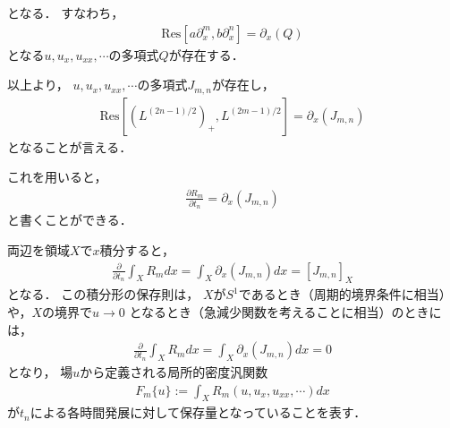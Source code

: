 \documentclass[dvipdfmx,12pt,a4paper,uplatex]{jsarticle}
\theoremstyle{plain}
\theoremstyle{definition}
\begin{document}
となる．
すなわち，
\begin{align}
\mathrm{Res}
\left[a\partial_x^m , b\partial_x^n \right] 
=
\partial_x(Q)
\end{align}
となる$u,u_x,u_{xx},\cdots$の多項式$Q$が存在する．

以上より，
$u,u_x,u_{xx},\cdots$の多項式$J_{m,n}$が存在し，
\begin{align}
\mathrm{Res}\left[\left(L^{(2n-1)/2}\right)_+,L^{(2m-1)/2}\right]
=
\partial_x(J_{m,n})
\end{align}
となることが言える．

これを用いると，
\begin{align}
\frac{\partial R_m}{\partial t_n} 
= 
\partial_x(J_{m,n})
\end{align}
と書くことができる．

両辺を領域$X$で$x$積分すると，
\begin{align}
\frac{\partial}{\partial t_n}
\int_{X} R_m dx = 
\int_X \partial_x\left( J_{m,n} \right) dx
= \left[ J_{m,n} \right]_X
\end{align}
となる．
この積分形の保存則は，
$X$が$S^1$であるとき（周期的境界条件に相当）や，$X$の境界で$u\rightarrow0$
となるとき（急減少関数を考えることに相当）のときには，
\begin{align}
\frac{\partial}{\partial t_n}
\int_{X} R_m dx = 
\int_X \partial_x\left( J_{m,n} \right) dx
= 0
\end{align}
となり，
場$u$から定義される局所的密度汎関数
\begin{align}
F_m\{u\} := \int_{X} R_m(u,u_x,u_{xx},\cdots) dx
\end{align}
が$t_n$による各時間発展に対して保存量となっていることを表す．
\end{document}
